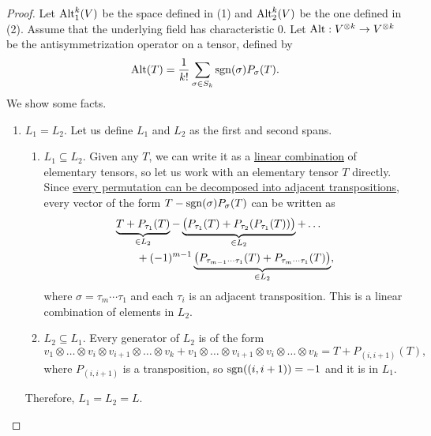 	\begin{proof}
		Let $\operatorname{Alt}^k_1(V)$ be the space defined in (1) and $\operatorname{Alt}^k_2(V)$ be the one defined in (2). Assume that the underlying field has characteristic $0$. Let $\operatorname{Alt}: V^{\otimes k} \to V^{\otimes k}$ be the antisymmetrization operator on a tensor, defined by
		\begin{equation}
			\operatorname{Alt}(T) = \frac{1}{k!} \sum_{\sigma \in S_k} \operatorname{sgn}(\sigma) P_\sigma(T).
		\end{equation}
		We show some facts.
		\begin{enumerate}
			\item \textit{$L_1 = L_2$}. Let us define $L_1$ and $L_2$ as the first and second spans.
				\begin{enumerate}
					\item $L_1 \subseteq L_2$. Given any $T$, we can write it as a \hyperref[def:linear-combination]{linear combination} of elementary tensors, so let us work with an elementary tensor $T$ directly. Since \hyperref[alg-thm:transposition_decomposition]{every permutation can be decomposed into adjacent transpositions}, every vector of the form $T - \operatorname{sgn}(\sigma) P_\sigma(T)$ can be written as
						\begin{align}
							&\underbrace{T + P_{\tau_1}(T)}_{\in L_2}
							- \underbrace{\big(P_{\tau_1}(T) + P_{\tau_2}(P_{\tau_1}(T))\big)}_{\in L_2}
							+ \ldots \notag\\
							&\qquad + (-1)^{m-1}
							\underbrace{\big(P_{\tau_{m-1}\cdots\tau_1}(T)
							+ P_{\tau_m\cdots\tau_1}(T)\big)}_{\in L_2},
						\end{align}
						where $\sigma = \tau_m \cdots \tau_1$ and each $\tau_i$ is an adjacent transposition. This is a linear combination of elements in $L_2$.

					\item $L_2 \subseteq L_1$. Every generator of $L_2$ is of the form
						\begin{equation}
							v_1 \otimes \ldots \otimes v_i \otimes v_{i+1} \otimes \ldots \otimes v_k
							+ v_1 \otimes \ldots \otimes v_{i+1} \otimes v_i \otimes \ldots \otimes v_k
							= T + P_{(i,i+1)}(T),
						\end{equation}
						where $P_{(i,i+1)}$ is a transposition, so $\operatorname{sgn}((i,i+1))=-1$ and it is in $L_1$.
				\end{enumerate}
				Therefore, $L_1 = L_2 = L$.


\end{enumerate}
\end{proof}

